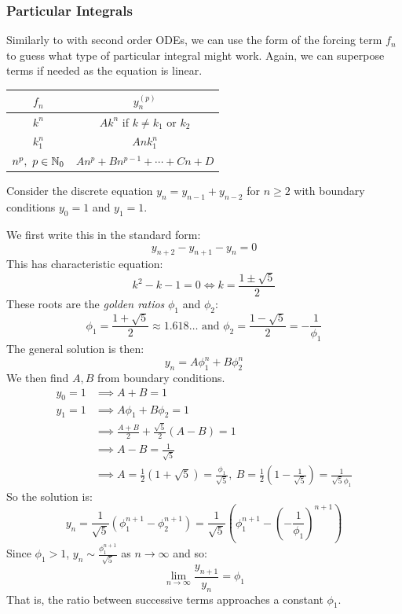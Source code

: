 \documentclass[../main.tex]{subfiles}
\begin{document}
\subsubsection{Particular Integrals}
Similarly to with second order ODEs, we can use the form of the forcing term $f_n$ to guess what type of particular integral might work.
Again, we can superpose terms if needed as the equation is linear.
\begin{center}
\begin{tabular}{c|c}
$f_n$ & $y^{(p)}_n$ \\
\hline
$k^{n}$ & $Ak^{n}$ if $k \neq k_1 \text{ or }k_2$ \\
$k^{n}_{1}$ & $Ank^{n}_{1}$ \\
$n^{p},\ p \in \mathbb{N}_0$ & $An^{p} + Bn^{p - 1} + \cdots + Cn + D$
\end{tabular}
\end{center}
\begin{example}
  Consider the discrete equation $y_n = y_{n - 1} + y_{n - 2}$ for $n \geq 2$ with boundary conditions $y_0 = 1$ and $y_1 = 1$.

  We first write this in the standard form:
  \[
    y_{n + 2} - y_{n + 1} - y_{n} = 0
  \]
  This has characteristic equation:
  \[
    k^2 - k - 1 = 0 \iff k = \frac{1 \pm \sqrt{5}}{2}
  \]
  These roots are the \textit{golden ratios} $\phi_1$ and $\phi_2$:
  \[
    \phi_1 = \frac{1 + \sqrt{5}}{2} \approx 1.618\ldots \text{ and } \phi_2 = \frac{1 - \sqrt{5}}{2} =-\frac{1}{\phi_1}
  \]
  The general solution is then:
  \[
    y_n = A\phi^{n}_{1} + B\phi^{n}_2
  \]
  We then find $A, B$ from boundary conditions.
  \begin{align*}
    y_0 = 1 &\implies A + B = 1 \\
    y_1  = 1 &\implies A\phi_1 + B\phi_2 = 1 \\
             &\implies \frac{A + B}{2} + \frac{\sqrt{5}}{2}(A - B) = 1 \\
             &\implies A - B = \frac{1}{\sqrt{5}} \\
             &\implies A = \frac{1}{2}(1 + \sqrt{5}) = \frac{\phi_1}{\sqrt{5}},\ B = \frac{1}{2}\left(1 - \frac{1}{\sqrt{5}}\right) = \frac{1}{\sqrt{5}\phi_1}
  \end{align*}
  So the solution is:
  \[
    y_n = \frac{1}{\sqrt{5}}(\phi^{n + 1}_1 - \phi^{n + 1}_2) = \frac{1}{\sqrt{5}}\left(\phi^{n + 1}_1 - \left(-\frac{1}{\phi_1}\right)^{n + 1}\right)
  \]
  Since $\phi_1 > 1$, $y_n \sim \frac{\phi^{n + 1}_1}{\sqrt{5}}$ as $n \to \infty$ and so:
  \[
    \lim_{n \to \infty} \frac{y_{n + 1}}{y_n} = \phi_1
  \]
  That is, the ratio between successive terms approaches a constant $\phi_1$.
\end{example}
\end{document}
